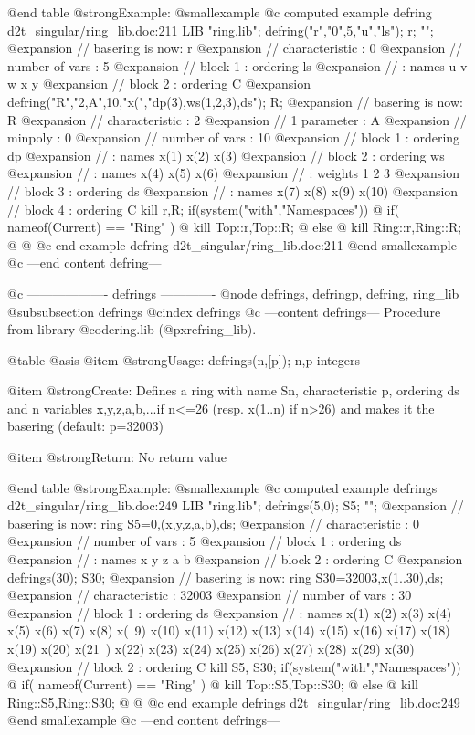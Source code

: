 @end table
@strong{Example:}
@smallexample
@c computed example defring d2t_singular/ring_lib.doc:211 
LIB "ring.lib";
defring("r","0",5,"u","ls"); r; "";
@expansion{} // basering is now: r
@expansion{} //   characteristic : 0
@expansion{} //   number of vars : 5
@expansion{} //        block   1 : ordering ls
@expansion{} //                  : names    u v w x y 
@expansion{} //        block   2 : ordering C
@expansion{} 
defring("R","2,A",10,"x(","dp(3),ws(1,2,3),ds"); R;
@expansion{} // basering is now: R
@expansion{} //   characteristic : 2
@expansion{} //   1 parameter    : A 
@expansion{} //   minpoly        : 0
@expansion{} //   number of vars : 10
@expansion{} //        block   1 : ordering dp
@expansion{} //                  : names    x(1) x(2) x(3) 
@expansion{} //        block   2 : ordering ws
@expansion{} //                  : names    x(4) x(5) x(6) 
@expansion{} //                  : weights     1    2    3 
@expansion{} //        block   3 : ordering ds
@expansion{} //                  : names    x(7) x(8) x(9) x(10) 
@expansion{} //        block   4 : ordering C
kill r,R;
if(system("with","Namespaces")) @{
if( nameof(Current) == "Ring" ) @{
kill Top::r,Top::R;
@} else @{
kill Ring::r,Ring::R;
@}
@}
@c end example defring d2t_singular/ring_lib.doc:211
@end smallexample
@c ---end content defring---

@c ------------------- defrings -------------
@node defrings, defringp, defring, ring_lib
@subsubsection defrings
@cindex defrings
@c ---content defrings---
Procedure from library @code{ring.lib} (@pxref{ring_lib}).

@table @asis
@item @strong{Usage:}
defrings(n,[p]); n,p integers

@item @strong{Create:}
Defines a ring with name Sn, characteristic p, ordering ds and n
variables x,y,z,a,b,...if n<=26 (resp. x(1..n) if n>26) and makes it
the basering (default: p=32003)

@item @strong{Return:}
No return value

@end table
@strong{Example:}
@smallexample
@c computed example defrings d2t_singular/ring_lib.doc:249 
LIB "ring.lib";
defrings(5,0); S5; "";
@expansion{} // basering is now: ring S5=0,(x,y,z,a,b),ds;
@expansion{} //   characteristic : 0
@expansion{} //   number of vars : 5
@expansion{} //        block   1 : ordering ds
@expansion{} //                  : names    x y z a b 
@expansion{} //        block   2 : ordering C
@expansion{} 
defrings(30); S30;
@expansion{} // basering is now: ring S30=32003,x(1..30),ds;
@expansion{} //   characteristic : 32003
@expansion{} //   number of vars : 30
@expansion{} //        block   1 : ordering ds
@expansion{} //                  : names    x(1) x(2) x(3) x(4) x(5) x(6) x(7) x(8) x(\
   9) x(10) x(11) x(12) x(13) x(14) x(15) x(16) x(17) x(18) x(19) x(20) x(21\
   ) x(22) x(23) x(24) x(25) x(26) x(27) x(28) x(29) x(30) 
@expansion{} //        block   2 : ordering C
kill S5, S30;
if(system("with","Namespaces")) @{
if( nameof(Current) == "Ring" ) @{
kill Top::S5,Top::S30;
@} else @{
kill Ring::S5,Ring::S30;
@}
@}
@c end example defrings d2t_singular/ring_lib.doc:249
@end smallexample
@c ---end content defrings---

